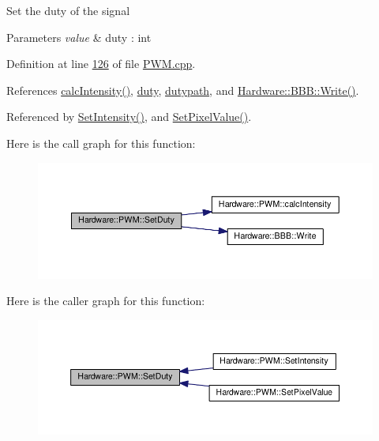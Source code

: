 Set the duty of the signal 


\begin{DoxyParams}{Parameters}
{\em value} & duty \+: int\\
\hline
\end{DoxyParams}


Definition at line \hyperlink{_p_w_m_8cpp_source_l00126}{126} of file \hyperlink{_p_w_m_8cpp_source}{P\+W\+M.\+cpp}.



References \hyperlink{_p_w_m_8cpp_source_l00070}{calc\+Intensity()}, \hyperlink{_p_w_m_8h_source_l00056}{duty}, \hyperlink{_p_w_m_8h_source_l00063}{dutypath}, and \hyperlink{_b_b_b_8cpp_source_l00042}{Hardware\+::\+B\+B\+B\+::\+Write()}.



Referenced by \hyperlink{_p_w_m_8cpp_source_l00090}{Set\+Intensity()}, and \hyperlink{_p_w_m_8cpp_source_l00102}{Set\+Pixel\+Value()}.



Here is the call graph for this function\+:
\nopagebreak
\begin{figure}[H]
\begin{center}
\leavevmode
\includegraphics[width=350pt]{class_hardware_1_1_p_w_m_a93ea3627da17bf143ac548cbd623d13d_cgraph}
\end{center}
\end{figure}




Here is the caller graph for this function\+:
\nopagebreak
\begin{figure}[H]
\begin{center}
\leavevmode
\includegraphics[width=350pt]{class_hardware_1_1_p_w_m_a93ea3627da17bf143ac548cbd623d13d_icgraph}
\end{center}
\end{figure}


